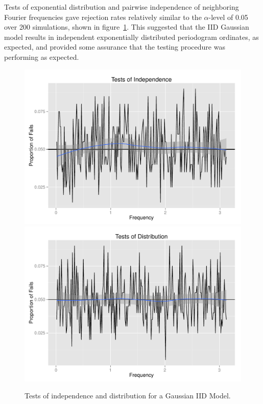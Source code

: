\documentclass{article}\usepackage[]{graphicx}\usepackage[]{color}
\newenvironment{knitrout}{}{} %
\theoremstyle{plain}
\begin{document}
Tests of exponential distribution and pairwise independence of neighboring Fourier frequencies gave rejection rates relatively similar to the $\alpha$-level of 0.05 over 200 simulations, shown in figure~\ref{fig:tests-iid}. This suggested that the IID Gaussian model results in independent exponentially distributed periodogram ordinates, as expected, and provided some assurance that the testing procedure was performing as expected.

\begin{knitrout}
\color{fgcolor}\begin{figure}[h]

\includegraphics[width=.49\textwidth]{figure/tests-iid1} 
\includegraphics[width=.49\textwidth]{figure/tests-iid2} \caption[Tests of independence and distribution for a Gaussian IID Model]{Tests of independence and distribution for a Gaussian IID Model.\label{fig:tests-iid}}
\end{figure}


\end{knitrout}
\end{document}
